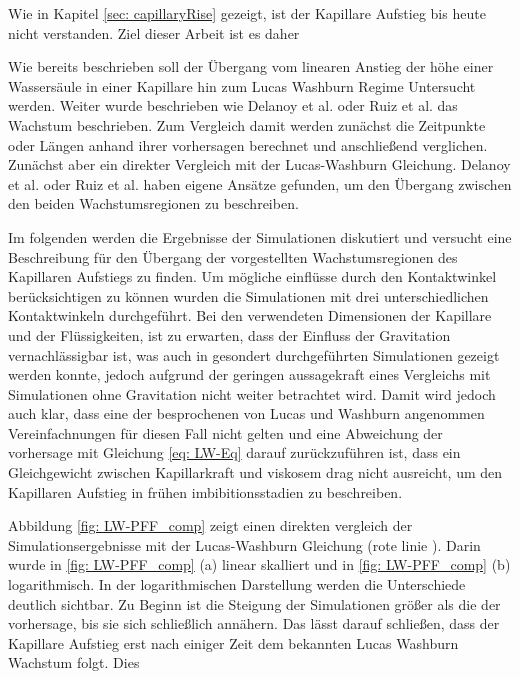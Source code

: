 

Wie in Kapitel \ref{sec: capillaryRise} gezeigt, ist der Kapillare Aufstieg bis heute nicht verstanden. Ziel dieser Arbeit ist es daher 


Wie bereits beschrieben soll der Übergang vom linearen Anstieg der höhe einer Wassersäule in einer Kapillare hin zum Lucas Washburn Regime Untersucht werden. Weiter wurde beschrieben wie Delanoy et al. \cite{delannoy2019DualRoleViscosity} oder Ruiz et al. \cite{ruiz-gutierrez2022LongCrossoverDynamics} das Wachstum beschrieben. Zum Vergleich damit werden zunächst die Zeitpunkte oder Längen anhand ihrer vorhersagen berechnet und anschließend verglichen. Zunächst aber ein direkter Vergleich mit der Lucas-Washburn Gleichung. 
Delanoy et al. \cite{delannoy2019DualRoleViscosity} oder Ruiz et al. \cite{ruiz-gutierrez2022LongCrossoverDynamics} haben eigene Ansätze gefunden, um den Übergang zwischen den beiden Wachstumsregionen zu beschreiben. 


Im folgenden werden die Ergebnisse der Simulationen diskutiert und versucht eine Beschreibung für den Übergang der vorgestellten Wachstumsregionen des Kapillaren Aufstiegs zu finden. Um mögliche einflüsse durch den Kontaktwinkel berücksichtigen zu können wurden die Simulationen mit drei unterschiedlichen Kontaktwinkeln durchgeführt. Bei den verwendeten Dimensionen der Kapillare und der Flüssigkeiten, ist zu erwarten, dass der Einfluss der Gravitation vernachlässigbar ist, was auch in gesondert durchgeführten Simulationen gezeigt werden konnte, jedoch aufgrund der geringen aussagekraft eines Vergleichs mit Simulationen ohne Gravitation nicht weiter betrachtet wird. Damit wird jedoch auch klar, dass eine der besprochenen von Lucas und Washburn angenommen Vereinfachnungen für diesen Fall nicht gelten und eine Abweichung der vorhersage mit Gleichung \ref{eq: LW-Eq} darauf zurückzuführen ist, dass ein Gleichgewicht zwischen Kapillarkraft und viskosem drag nicht ausreicht, um den Kapillaren Aufstieg in frühen imbibitionsstadien zu beschreiben. 

Abbildung \ref{fig: LW-PFF_comp} zeigt einen direkten vergleich der Simulationsergebnisse mit der Lucas-Washburn Gleichung (rote linie ). Darin wurde in \ref{fig: LW-PFF_comp} (a) linear skalliert und in \ref{fig: LW-PFF_comp} (b) logarithmisch. In der logarithmischen Darstellung werden die Unterschiede deutlich sichtbar. Zu Beginn ist die Steigung der Simulationen größer als die der vorhersage, bis sie sich schließlich annähern. Das lässt darauf schließen, dass der Kapillare Aufstieg erst nach einiger Zeit dem bekannten Lucas Washburn Wachstum folgt. Dies 

